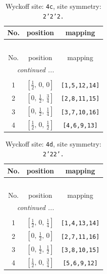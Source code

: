 \documentclass[fleqn,8pt]{jsarticle}
\begin{document}
\renewcommand{\arraystretch}{1.2}
\begin{longtable}{ccc}
\caption{Wyckoff site: {\tt 4c}, site symmetry: {\tt 2'2'2.}}
 \\
 \hline \hline
No. & position & mapping \\ \hline \endfirsthead

\multicolumn{2}{l}{\tablename\ \thetable{}} \\
 \hline \hline
No. & position & mapping \\ \hline \endhead

 \hline \hline
\multicolumn{2}{r}{\footnotesize\it continued ...} \\ \endfoot

 \hline \hline
\multicolumn{2}{r}{} \\ \endlastfoot

1 & $\left[ \frac{1}{2},\, 0,\, 0 \right]$ & {\tt [1,5,12,14]} \\ \hline
2 & $\left[ 0,\, \frac{1}{2},\, \frac{3}{4} \right]$ & {\tt [2,8,11,15]} \\ \hline
3 & $\left[ 0,\, \frac{1}{2},\, \frac{1}{4} \right]$ & {\tt [3,7,10,16]} \\ \hline
4 & $\left[ \frac{1}{2},\, 0,\, \frac{1}{2} \right]$ & {\tt [4,6,9,13]} \\
\end{longtable}
\renewcommand{\arraystretch}{1.2}
\begin{longtable}{ccc}
\caption{Wyckoff site: {\tt 4d}, site symmetry: {\tt 2'22'.}}
 \\
 \hline \hline
No. & position & mapping \\ \hline \endfirsthead

\multicolumn{2}{l}{\tablename\ \thetable{}} \\
 \hline \hline
No. & position & mapping \\ \hline \endhead

 \hline \hline
\multicolumn{2}{r}{\footnotesize\it continued ...} \\ \endfoot

 \hline \hline
\multicolumn{2}{r}{} \\ \endlastfoot

1 & $\left[ \frac{1}{2},\, 0,\, \frac{1}{4} \right]$ & {\tt [1,4,13,14]} \\ \hline
2 & $\left[ 0,\, \frac{1}{2},\, 0 \right]$ & {\tt [2,7,11,16]} \\ \hline
3 & $\left[ 0,\, \frac{1}{2},\, \frac{1}{2} \right]$ & {\tt [3,8,10,15]} \\ \hline
4 & $\left[ \frac{1}{2},\, 0,\, \frac{3}{4} \right]$ & {\tt [5,6,9,12]} \\
\end{longtable}
\end{document}
